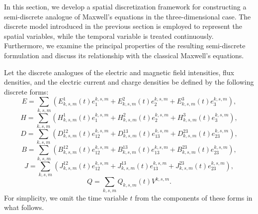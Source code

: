 \documentclass[english]{article}
\theoremstyle{plain}
\theoremstyle{definition}
\theoremstyle{remark}
\numberwithin{equation}{section}
\begin{document}
In this section, we develop a spatial discretization framework for constructing a semi-discrete analogue of Maxwell’s equations in the three-dimensional case. The discrete model introduced in the previous section is employed to represent the spatial variables, while the temporal variable is treated continuously. Furthermore, we examine the principal properties of the resulting semi-discrete formulation and discuss its relationship with the classical Maxwell’s equations.

Let the discrete analogues of the electric and magnetic field intensities, flux densities, and the electric current and charge densities be defined by the following discrete forms:
\begin{equation}\label{3.1}
    E=\sum_{k,s,m}\left(E^1_{k,s,m}(t)e_1^{k,s,m}+E^2_{k,s,m}(t)e_2^{k,s,m}+E^3_{k,s,m}(t)e_3^{k,s,m}\right ),
\end{equation}
\begin{equation}\label{3.2}
    H=\sum_{k,s,m}\left(H^1_{k,s,m}(t)e_1^{k,s,m}+H^2_{k,s,m}(t)e_2^{k,s,m}+H^3_{k,s,m}(t)e_3^{k,s,m}\right ),
\end{equation}
\begin{equation}\label{3.3}
D=\sum_{k,s,m}\left(D^{12}_{k,s,m}(t)e_{12}^{k,s,m}+D^{13}_{k,s,m}(t)e_{13}^{k,s,m}+D^{23}_{k,s,m}(t)e_{23}^{k,s,m}\right ),
\end{equation}
\begin{equation}\label{3.4}
B=\sum_{k,s,m}\left(B^{12}_{k,s,m}(t)e_{12}^{k,s,m}+B^{13}_{k,s,m}(t)e_{13}^{k,s,m}+B^{23}_{k,s,m}(t)e_{23}^{k,s,m}\right ),
\end{equation}
\begin{equation}\label{3.5}
J=\sum_{k,s,m}\left(J^{12}_{k,s,m}(t)e_{12}^{k,s,m}+J^{13}_{k,s,m}(t)e_{13}^{k,s,m}+J^{23}_{k,s,m}(t)e_{23}^{k,s,m}\right ),
\end{equation}
\begin{equation}\label{3.6}
Q=\sum_{k,s,m}Q_{k,s,m}(t)V^{k,s,m}.
\end{equation}
For simplicity, we  omit the time variable $t$ from the components of these forms in what follows.
\end{document}
